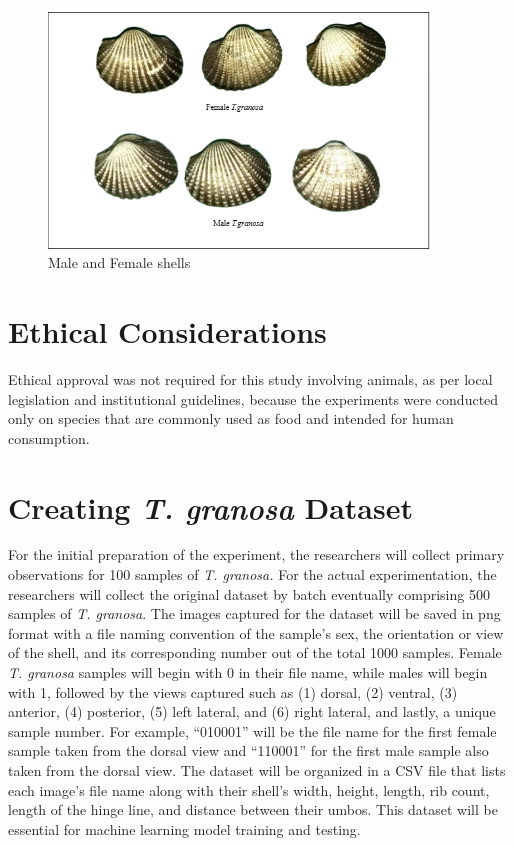 \begin{figure}[!htbp]
	\centering
	\includegraphics[width=0.9\textwidth]{figures/male-female T.granosa.png}
	\caption{Male and Female \Tegillarcagranosa shells}
\end{figure}

\section{Ethical Considerations}
\label{sec:ethical}

Ethical approval was not required for this study involving animals, as per local legislation and institutional guidelines, because the experiments were conducted only on species that are commonly used as food and intended for human consumption. 


\section{Creating \textit{T. granosa} Dataset}
\label{sec:dataset}

For the initial preparation of the experiment, the researchers will collect primary observations for 100 samples of \textit{T. granosa.} For the actual experimentation, the researchers will collect the original dataset by batch eventually comprising 500 samples of \textit{T. granosa}. The images captured for the dataset will be saved in png format with a file naming convention of the sample’s sex, the orientation or view of the shell, and its corresponding number out of the total 1000 samples. Female \textit{T. granosa} samples will begin with 0 in their file name, while males will begin with 1, followed by the views captured such as (1) dorsal, (2) ventral, (3) anterior, (4) posterior, (5) left lateral, and (6) right lateral, and lastly, a unique sample number. For example, “010001” will be the file name for the first female sample taken from the dorsal view and “110001” for the first male sample also taken from the dorsal view. The dataset will be organized in a CSV file that lists each image’s file name along with their shell’s width, height, length, rib count, length of the hinge line, and distance between their umbos. This dataset will be essential for machine learning model training and testing. 

